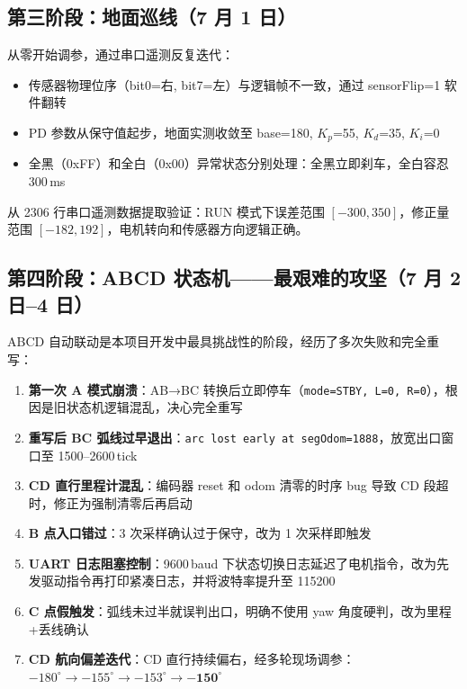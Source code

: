 \documentclass[12pt,a4paper]{ctexart}
\begin{document}
\subsection{第三阶段：地面巡线（7 月 1 日）}

从零开始调参，通过串口遥测反复迭代：

\begin{itemize}
    \item 传感器物理位序（bit0=右, bit7=左）与逻辑帧不一致，通过 sensorFlip=1 软件翻转
    \item PD 参数从保守值起步，地面实测收敛至 base=180, $K_p$=55, $K_d$=35, $K_i$=0
    \item 全黑（0xFF）和全白（0x00）异常状态分别处理：全黑立即刹车，全白容忍 300\,ms
\end{itemize}

从 2306 行串口遥测数据提取验证：RUN 模式下误差范围 $[-300, 350]$，修正量范围 $[-182, 192]$，电机转向和传感器方向逻辑正确。

\subsection{第四阶段：ABCD 状态机——最艰难的攻坚（7 月 2 日--4 日）}

ABCD 自动联动是本项目开发中最具挑战性的阶段，经历了多次失败和完全重写：

\begin{enumerate}
    \item \textbf{第一次 A 模式崩溃}：AB→BC 转换后立即停车（\texttt{mode=STBY, L=0, R=0}），根因是旧状态机逻辑混乱，决心完全重写
    \item \textbf{重写后 BC 弧线过早退出}：\texttt{arc lost early at segOdom=1888}，放宽出口窗口至 1500--2600\,tick
    \item \textbf{CD 直行里程计混乱}：编码器 reset 和 odom 清零的时序 bug 导致 CD 段超时，修正为强制清零后再启动
    \item \textbf{B 点入口错过}：3 次采样确认过于保守，改为 1 次采样即触发
    \item \textbf{UART 日志阻塞控制}：9600\,baud 下状态切换日志延迟了电机指令，改为先发驱动指令再打印紧凑日志，并将波特率提升至 115200
    \item \textbf{C 点假触发}：弧线未过半就误判出口，明确不使用 yaw 角度硬判，改为里程+丢线确认
    \item \textbf{CD 航向偏差迭代}：CD 直行持续偏右，经多轮现场调参：$-180^\circ \rightarrow -155^\circ \rightarrow -153^\circ \rightarrow \mathbf{-150^\circ}$
\end{enumerate}
\end{document}
